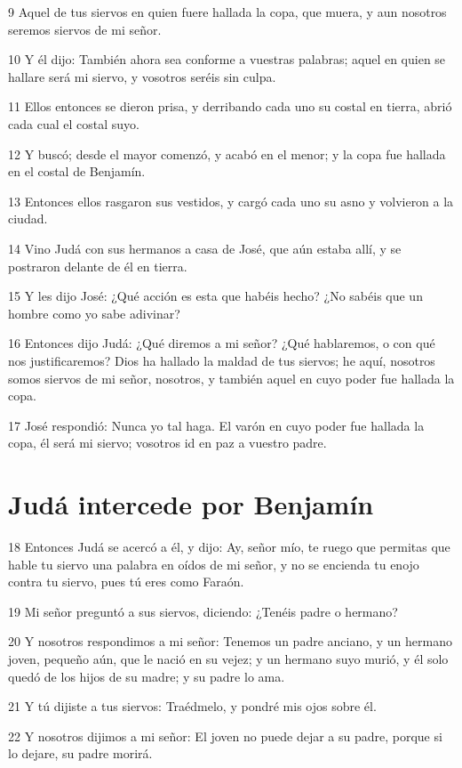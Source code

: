 9 Aquel de tus siervos en quien fuere hallada la copa, que muera, y aun nosotros seremos siervos de mi señor.

10 Y él dijo: También ahora sea conforme a vuestras palabras; aquel en quien se hallare será mi siervo, y vosotros seréis sin culpa.

11 Ellos entonces se dieron prisa, y derribando cada uno su costal en tierra, abrió cada cual el costal suyo.

12 Y buscó; desde el mayor comenzó, y acabó en el menor; y la copa fue hallada en el costal de Benjamín.

13 Entonces ellos rasgaron sus vestidos, y cargó cada uno su asno y volvieron a la ciudad.

14 Vino Judá con sus hermanos a casa de José, que aún estaba allí, y se postraron delante de él en tierra.

15 Y les dijo José: ¿Qué acción es esta que habéis hecho? ¿No sabéis que un hombre como yo sabe adivinar?

16 Entonces dijo Judá: ¿Qué diremos a mi señor? ¿Qué hablaremos, o con qué nos justificaremos? Dios ha hallado la maldad de tus siervos; he aquí, nosotros somos siervos de mi señor, nosotros, y también aquel en cuyo poder fue hallada la copa.

17 José respondió: Nunca yo tal haga. El varón en cuyo poder fue hallada la copa, él será mi siervo; vosotros id en paz a vuestro padre.

\section{Judá intercede por Benjamín}

18 Entonces Judá se acercó a él, y dijo: Ay, señor mío, te ruego que permitas que hable tu siervo una palabra en oídos de mi señor, y no se encienda tu enojo contra tu siervo, pues tú eres como Faraón.

19 Mi señor preguntó a sus siervos, diciendo: ¿Tenéis padre o hermano?

20 Y nosotros respondimos a mi señor: Tenemos un padre anciano, y un hermano joven, pequeño aún, que le nació en su vejez; y un hermano suyo murió, y él solo quedó de los hijos de su madre; y su padre lo ama.

21 Y tú dijiste a tus siervos: Traédmelo, y pondré mis ojos sobre él.

22 Y nosotros dijimos a mi señor: El joven no puede dejar a su padre, porque si lo dejare, su padre morirá.

